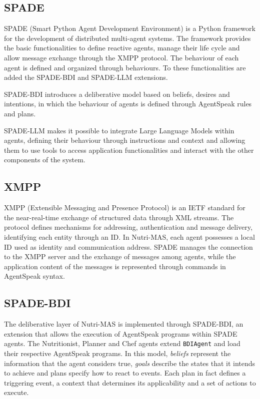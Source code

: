 \documentclass[12pt,a4paper]{article}
\begin{document}
\subsection{SPADE}

SPADE (Smart Python Agent Development Environment) is a Python framework for
the development of distributed multi-agent systems. The framework provides the
basic functionalities to define reactive agents, manage their life cycle and
allow message exchange through the XMPP protocol. 
The behaviour of each agent is defined and organized through
behaviours. To these functionalities are added the SPADE-BDI and SPADE-LLM extensions.

SPADE-BDI introduces a deliberative model based on beliefs, desires and
intentions, in which the behaviour of agents is defined through
AgentSpeak rules and plans. 

SPADE-LLM makes it possible to integrate Large Language Models within agents,
defining their behaviour through instructions and context and allowing them
to use tools to access application
functionalities and interact with the other components of the system.

\subsection{XMPP}

XMPP (Extensible Messaging and Presence Protocol) is an IETF standard for the
near-real-time exchange of structured data through XML streams. The
protocol defines mechanisms for addressing, authentication and
message delivery, identifying each entity through an ID. 
In Nutri-MAS, each agent possesses a local ID used as
identity and communication address. SPADE manages the connection to the
XMPP server and the exchange of messages among agents, while the application
content of the messages is represented through commands in AgentSpeak syntax.

\subsection{SPADE-BDI}

The deliberative layer of Nutri-MAS is implemented through SPADE-BDI,
an extension that allows the execution of AgentSpeak programs within
SPADE agents. The Nutritionist, Planner and Chef agents extend
\texttt{BDIAgent} and load their respective AgentSpeak programs. In this
model, \emph{beliefs} represent the information that the agent considers
true, \emph{goals} describe the states that it intends to achieve and plans
specify how to react to events. Each plan in fact defines a triggering
event, a context that determines its applicability and a set of actions
to execute.
\end{document}
